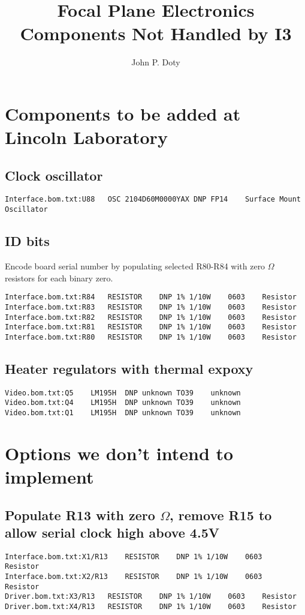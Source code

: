 \documentclass[11pt]{article}
\author{
John P. Doty
}
\title{Focal Plane Electronics Components Not Handled by I3}
\date{}
\begin{document}
\maketitle
\begin{center}

\end{center}


\section{Components to be added at Lincoln Laboratory}
\subsection{Clock oscillator}
\begin{verbatim}
Interface.bom.txt:U88	OSC	2104D60M0000YAX	DNP	FP14	Surface Mount Oscillator	
\end{verbatim}

\subsection{ID bits}

Encode board serial number
by populating selected R80-R84
with zero $\Omega$ resistors for
each binary zero.

\begin{verbatim}
Interface.bom.txt:R84	RESISTOR	DNP	1% 1/10W	0603	Resistor	
Interface.bom.txt:R83	RESISTOR	DNP	1% 1/10W	0603	Resistor	
Interface.bom.txt:R82	RESISTOR	DNP	1% 1/10W	0603	Resistor	
Interface.bom.txt:R81	RESISTOR	DNP	1% 1/10W	0603	Resistor	
Interface.bom.txt:R80	RESISTOR	DNP	1% 1/10W	0603	Resistor	
\end{verbatim}

\subsection{Heater regulators with thermal expoxy}
\begin{verbatim}
Video.bom.txt:Q5	LM195H	DNP	unknown	TO39	unknown	
Video.bom.txt:Q4	LM195H	DNP	unknown	TO39	unknown	
Video.bom.txt:Q1	LM195H	DNP	unknown	TO39	unknown	
\end{verbatim}


\section{Options we don't intend to implement}

\subsection{Populate R13 with zero $\Omega$, remove R15 to allow serial clock high above 4.5V}
\begin{verbatim}
Interface.bom.txt:X1/R13	RESISTOR	DNP	1% 1/10W	0603	Resistor	
Interface.bom.txt:X2/R13	RESISTOR	DNP	1% 1/10W	0603	Resistor	
Driver.bom.txt:X3/R13	RESISTOR	DNP	1% 1/10W	0603	Resistor	
Driver.bom.txt:X4/R13	RESISTOR	DNP	1% 1/10W	0603	Resistor	
\end{verbatim}
\end{document}
